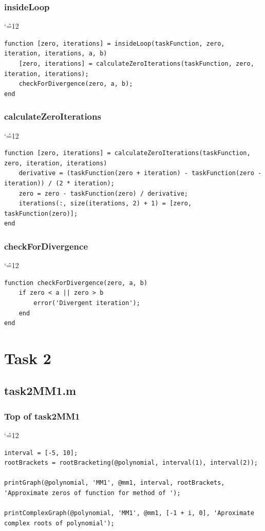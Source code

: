 \documentclass[12pt]{report}
\newenvironment{simplechar}{%
   \catcode`\^=12
}{}
\begin{document}
\subsubsection{insideLoop}
\begin{simplechar}
\begin{lstlisting}
function [zero, iterations] = insideLoop(taskFunction, zero, iteration, iterations, a, b)
    [zero, iterations] = calculateZeroIterations(taskFunction, zero, iteration, iterations);
    checkForDivergence(zero, a, b);
end
\end{lstlisting}
\end{simplechar}

\subsubsection{calculateZeroIterations}
\begin{simplechar}
\begin{lstlisting}
function [zero, iterations] = calculateZeroIterations(taskFunction, zero, iteration, iterations)
    derivative = (taskFunction(zero + iteration) - taskFunction(zero - iteration)) / (2 * iteration);
    zero = zero - taskFunction(zero) / derivative;
    iterations(:, size(iterations, 2) + 1) = [zero, taskFunction(zero)];
end
\end{lstlisting}
\end{simplechar}

\subsubsection{checkForDivergence}
\begin{simplechar}
\begin{lstlisting}
function checkForDivergence(zero, a, b)
    if zero < a || zero > b
        error('Divergent iteration');
    end
end
\end{lstlisting}
\end{simplechar}

\newpage
\section{Task 2}

\subsection{task2MM1.m}

\subsubsection{Top of task2MM1}
\begin{simplechar}
\begin{lstlisting}
interval = [-5, 10];
rootBrackets = rootBracketing(@polynomial, interval(1), interval(2));

printGraph(@polynomial, 'MM1', @mm1, interval, rootBrackets, 'Approximate zeros of function for method of ');

printComplexGraph(@polynomial, 'MM1', @mm1, [-1 + i, 0], 'Aproximate complex roots of polynomial');
\end{lstlisting}
\end{simplechar}
\end{document}
